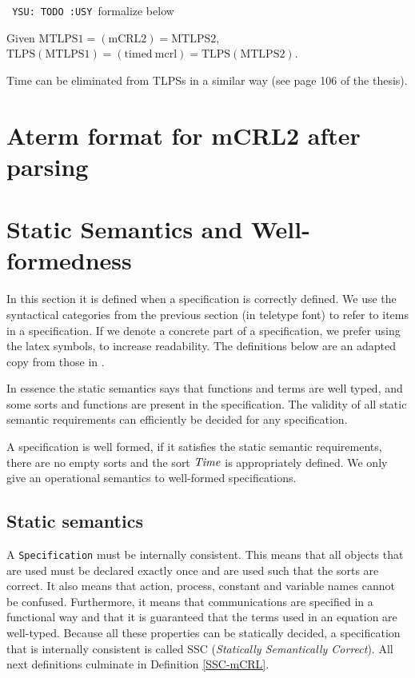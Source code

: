 \documentclass[fleqn,a4paper,dvips]{article}
\def\YSU{\texttt{ YSU: TODO :USY\marginpar{!!!} }}
\begin{document}
\YSU formalize below

\begin{thm}
  Given
  $\mathrm{MTLPS1}=(\mathrm{mCRL2})=\mathrm{MTLPS2}$,\\
  $\mathrm{TLPS(MTLPS1)}=(\mathrm{timed\ mcrl})=\mathrm{TLPS(MTLPS2)}$.
\end{thm}

Time can be eliminated from TLPSs in a similar way (see page 106 of
the thesis).

\appendix
\newpage
\section{Aterm format for mCRL2 after parsing}

\section{Static Semantics and Well-formedness}
\label{section:SSC}
In this section it is defined when a specification is correctly defined.
We use the syntactical categories from the previous section (in teletype
font) to refer to items in a specification. If we denote a
concrete part of a specification, we prefer using the latex symbols, to
increase readability. The definitions below are an adapted copy from those in
\cite{GroPo94a}.

In
essence the static semantics says that functions and terms are well
typed, and some sorts and functions are present in the specification. The
validity of all static semantic requirements can efficiently be decided for any
specification.

A specification is well formed, if it satisfies the static semantic requirements,
there are no empty sorts and the sort $\mathit{Time}$ is appropriately defined. We
only give an operational semantics to well-formed specifications.

\subsection{Static semantics}
A {\tt Specification} must be internally consistent. This means
that all objects that are used must be declared exactly once and
are used such that the sorts are correct. It also means that action,
process, constant and variable names cannot be confused.
Furthermore, it means that communications are specified in a functional
way and that it is guaranteed that the terms used in an equation are well-typed.
Because all these properties can be statically decided, a
specification that is internally consistent is called SSC
({\em Statically Semantically Correct}). All next definitions
culminate in Definition \ref{SSC-mCRL}.
\end{document}
